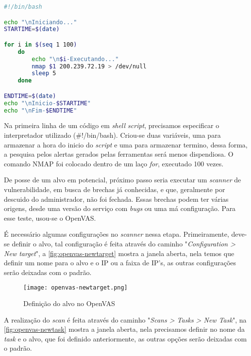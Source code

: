 \begin{lstlisting}[title={Automatização das execuções do comando NMAP},language=bash, frame=single, label={lst:script-nmap}]
#!/bin/bash

echo "\nIniciando..."
STARTIME=$(date)

for i in $(seq 1 100)
    do  
        echo "\n$i-Executando..."
        nmap $1 200.239.72.19 > /dev/null
        sleep 5
    done

ENDTIME=$(date)                                                                                                                                                           
echo "\nInicio-$STARTIME"
echo "\nFim-$ENDTIME"
\end{lstlisting}

Na primeira linha de um código em \textit{shell script}, precisamos especificar o interpretador utilizado (\#!/bin/bash). Criou-se duas variáveis, uma para armazenar a hora do inicio do \textit{script} e uma para armazenar termino, dessa forma, a pesquisa pelos alertas gerados pelas ferramentas será menos dispendiosa. O comando NMAP foi colocado dentro de um laço \textit{for}, executado 100 vezes. 

De posse de um alvo em potencial, próximo passo seria executar um \textit{scanner} de vulnerabilidade, em busca de brechas já conhecidas, e que, geralmente por descuido do administrador, não foi fechada. Essas brechas podem ter várias origens, desde uma versão do serviço com \textit{bugs} ou uma má configuração. Para esse teste, usou-se o OpenVAS.

É necessário algumas configurações no \textit{scanner} nessa etapa. Primeiramente, deve-se definir o alvo, tal configuração é feita através do caminho "\textit{Configuration > New target}", a \autoref{fig:openvas-newtarget} mostra a janela aberta, nela temos que definir um nome para o alvo e o IP ou a faixa de IP's, as outras configurações serão deixadas com o padrão.

\begin{figure}[!htb]
\centering
\caption{Definição do alvo no OpenVAS}
\texttt{[image: openvas-newtarget.png]}
\label{fig:openvas-newtarget}
\end{figure}

A realização do \textit{scan} é feita através do caminho "\textit{Scans > Tasks > New Task}", na \autoref{fig:openvas-newtask} mostra a janela aberta, nela precisamos definir no nome da \textit{task} e o alvo, que foi definido anteriormente, as outras opções serão deixadas com o padrão. 

